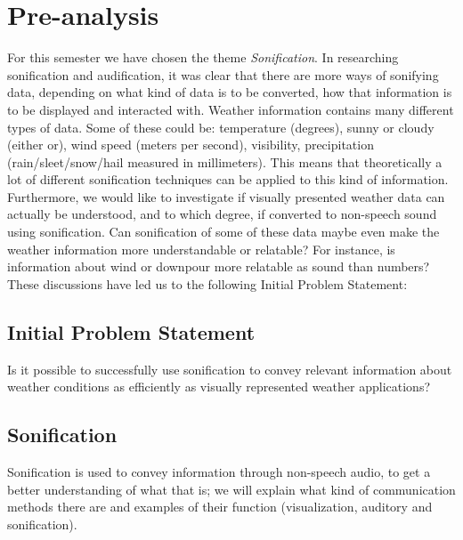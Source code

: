 
\section{Pre-analysis} %
\label{sec:preanalysis}

For this semester we have chosen the theme \textit{Sonification}.
In researching sonification and audification, it was clear that there are more ways of sonifying data, depending on what kind of data is to be converted, how that information is to be displayed and interacted with. 
Weather information contains many different types of data. 
Some of these could be: \newline
temperature (degrees), sunny or cloudy (either or), wind speed (meters per second), visibility, precipitation (rain/sleet/snow/hail measured in millimeters). 
This means that theoretically a lot of different sonification techniques can be applied to this kind of information. 
Furthermore, we would like to investigate if visually presented weather data can actually be understood, and to which degree, if converted to non-speech sound using sonification. 
Can sonification of some of these data maybe even make the weather information more understandable or relatable? 
For instance, is information about wind or downpour more relatable as sound than numbers? These discussions have led us to the following Initial Problem Statement:


\subsection{Initial Problem Statement} %
\label{sub:initial_problem_statement}

Is it possible to successfully use sonification to convey relevant information about \newline 
weather conditions as efficiently as visually represented weather applications?



\subsection{Sonification} %
\label{sub:sonification}

Sonification is used to convey information through non-speech audio, to get a better understanding of what that is; 
we will explain what kind of communication methods there are and examples of their function (visualization, auditory and sonification).


